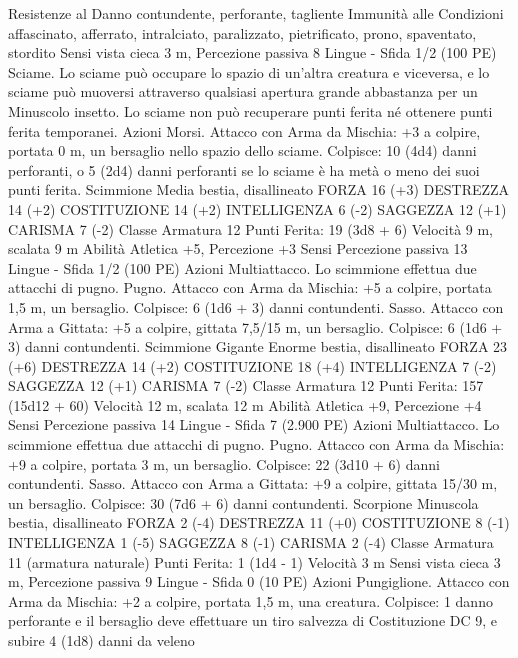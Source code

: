 \begin{multicols}{2}
Resistenze al Danno contundente, perforante, tagliente
Immunità alle Condizioni affascinato, afferrato, intralciato,
paralizzato, pietrificato, prono, spaventato, stordito
Sensi vista cieca 3 m, Percezione passiva 8
Lingue -
Sfida 1/2 (100 PE)
Sciame. Lo sciame può occupare lo spazio di un’altra creatura e
viceversa, e lo sciame può muoversi attraverso qualsiasi apertura
grande abbastanza per un Minuscolo insetto. Lo sciame non può
recuperare punti ferita né ottenere punti ferita temporanei.
Azioni
Morsi. Attacco con Arma da Mischia: +3 a colpire, portata 0 m,
un bersaglio nello spazio dello sciame.
Colpisce: 10 (4d4) danni perforanti, o 5 (2d4) danni perforanti se
lo sciame è ha metà o meno dei suoi punti ferita.
Scimmione
Media bestia, disallineato
FORZA 16 (+3)
DESTREZZA 14 (+2)
COSTITUZIONE 14 (+2)
INTELLIGENZA 6 (-2)
SAGGEZZA 12 (+1)
CARISMA 7 (-2)
Classe Armatura 12
\hspace*{0pt}\hfill{Punti Ferita}: 19 (3d8 + 6)
Velocità 9 m, scalata 9 m
Abilità Atletica +5, Percezione +3
Sensi Percezione passiva 13
Lingue -
Sfida 1/2 (100 PE)
Azioni
Multiattacco. Lo scimmione effettua due attacchi di pugno.
Pugno. Attacco con Arma da Mischia: +5 a colpire, portata 1,5
m, un bersaglio.
Colpisce: 6 (1d6 + 3) danni contundenti.
Sasso. Attacco con Arma a Gittata: +5 a colpire, gittata 7,5/15
m, un bersaglio.
Colpisce: 6 (1d6 + 3) danni contundenti.
Scimmione Gigante
Enorme bestia, disallineato
FORZA 23 (+6)
DESTREZZA 14 (+2)
COSTITUZIONE 18 (+4)
INTELLIGENZA 7 (-2)
SAGGEZZA 12 (+1)
CARISMA 7 (-2)
Classe Armatura 12
\hspace*{0pt}\hfill{Punti Ferita}: 157 (15d12 + 60)
Velocità 12 m, scalata 12 m
Abilità Atletica +9, Percezione +4
Sensi Percezione passiva 14
Lingue -
Sfida 7 (2.900 PE)
Azioni
Multiattacco. Lo scimmione effettua due attacchi di pugno.
Pugno. Attacco con Arma da Mischia: +9 a colpire, portata 3 m,
un bersaglio.
Colpisce: 22 (3d10 + 6) danni contundenti.
Sasso. Attacco con Arma a Gittata: +9 a colpire, gittata 15/30 m,
un bersaglio.
Colpisce: 30 (7d6 + 6) danni contundenti.
Scorpione
Minuscola bestia, disallineato
FORZA 2 (-4)
DESTREZZA 11 (+0)
COSTITUZIONE 8 (-1)
INTELLIGENZA 1 (-5)
SAGGEZZA 8 (-1)
CARISMA 2 (-4)
Classe Armatura 11 (armatura naturale)
\hspace*{0pt}\hfill{Punti Ferita}: 1 (1d4 - 1)
Velocità 3 m
Sensi vista cieca 3 m, Percezione passiva 9
Lingue -
Sfida 0 (10 PE)
Azioni
Pungiglione. Attacco con Arma da Mischia: +2 a colpire, portata
1,5 m, una creatura.
Colpisce: 1 danno perforante e il bersaglio deve effettuare un tiro
salvezza di Costituzione DC 9, e subire 4 (1d8) danni da veleno

\end{multicols}
